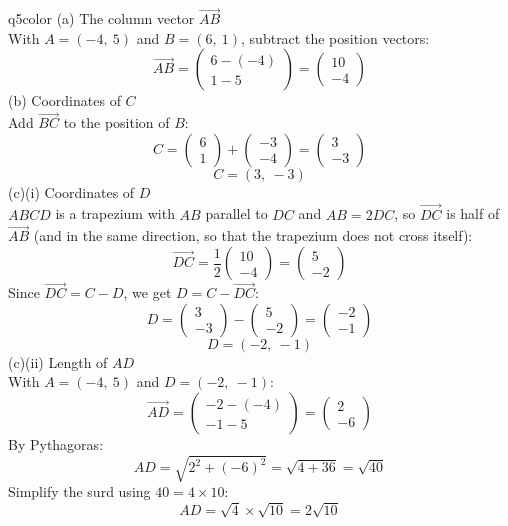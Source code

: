 \documentclass[11pt,a4paper]{article}
\begin{document}
\begin{ansbox}{q5color}
(a) The column vector $\overrightarrow{AB}$\\[4pt]
With $A = (-4,\ 5)$ and $B = (6,\ 1)$, subtract the position vectors:
\[
\overrightarrow{AB} = \begin{pmatrix} 6 - (-4) \\ 1 - 5 \end{pmatrix} = \boxed{\begin{pmatrix} 10 \\ -4 \end{pmatrix}}
\]
(b) Coordinates of $C$\\[4pt]
Add $\overrightarrow{BC}$ to the position of $B$:
\[
C = \begin{pmatrix} 6 \\ 1 \end{pmatrix} + \begin{pmatrix} -3 \\ -4 \end{pmatrix} = \begin{pmatrix} 3 \\ -3 \end{pmatrix}
\]
\[
C = \boxed{(3,\ -3)}
\]
(c)(i) Coordinates of $D$\\[4pt]
$ABCD$ is a trapezium with $AB$ parallel to $DC$ and $AB = 2DC$, so $\overrightarrow{DC}$ is half of $\overrightarrow{AB}$ (and in the same direction, so that the trapezium does not cross itself):
\[
\overrightarrow{DC} = \frac{1}{2}\begin{pmatrix} 10 \\ -4 \end{pmatrix} = \begin{pmatrix} 5 \\ -2 \end{pmatrix}
\]
Since $\overrightarrow{DC} = C - D$, we get $D = C - \overrightarrow{DC}$:
\[
D = \begin{pmatrix} 3 \\ -3 \end{pmatrix} - \begin{pmatrix} 5 \\ -2 \end{pmatrix} = \begin{pmatrix} -2 \\ -1 \end{pmatrix}
\]
\[
D = \boxed{(-2,\ -1)}
\]
(c)(ii) Length of $AD$\\[4pt]
With $A = (-4,\ 5)$ and $D = (-2,\ -1)$:
\[
\overrightarrow{AD} = \begin{pmatrix} -2 - (-4) \\ -1 - 5 \end{pmatrix} = \begin{pmatrix} 2 \\ -6 \end{pmatrix}
\]
By Pythagoras:
\[
AD = \sqrt{2^2 + (-6)^2} = \sqrt{4 + 36} = \sqrt{40}
\]
Simplify the surd using $40 = 4 \times 10$:
\[
AD = \sqrt{4}\times\sqrt{10} = \boxed{2\sqrt{10}}
\]
\end{ansbox}
\end{document}
